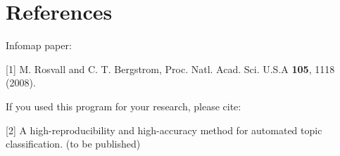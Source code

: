 \documentclass[11pt]{article}
\begin{document}
\section{References}


Infomap paper:

\vskip0.3cm

[1] M. Rosvall and    C. T. Bergstrom, Proc. Natl. Acad. Sci. U.S.A {\bf 105}, 1118 (2008).

\vskip0.3cm

\noindent If you used this program for your research, please cite:

\vskip0.3cm

[2] A high-reproducibility and high-accuracy method for automated topic classification. (to be published)
\end{document}
